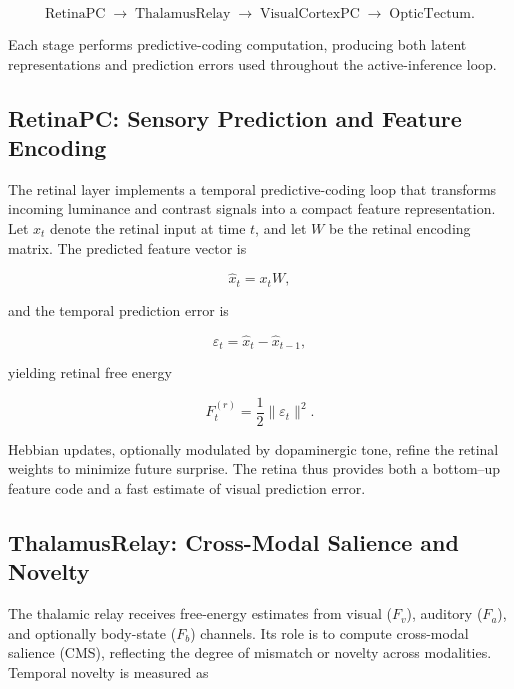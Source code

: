 \documentclass[9pt]{elife}
\begin{document}
\[
\text{RetinaPC} \;\rightarrow\; \text{ThalamusRelay} \;\rightarrow\; 
\text{VisualCortexPC} \;\rightarrow\; \text{OpticTectum}.
\]

Each stage performs predictive-coding computation, producing both latent
representations and prediction errors used throughout the active-inference loop.

\subsection{RetinaPC: Sensory Prediction and Feature Encoding}

The retinal layer implements a temporal predictive-coding loop that transforms
incoming luminance and contrast signals into a compact feature representation.
Let $x_t$ denote the retinal input at time $t$, and let $W$ be the retinal encoding
matrix.  The predicted feature vector is

\begin{equation}
\hat{x}_t = x_t W,
\end{equation}

and the temporal prediction error is

\begin{equation}
\varepsilon_t = \hat{x}_t - \hat{x}_{t-1},
\end{equation}

yielding retinal free energy

\begin{equation}
F^{(r)}_t = \frac{1}{2}\|\varepsilon_t\|^2.
\end{equation}

Hebbian updates, optionally modulated by dopaminergic tone, refine the retinal
weights to minimize future surprise.  
The retina thus provides both a bottom–up feature code and a fast estimate of
visual prediction error.

\subsection{ThalamusRelay: Cross-Modal Salience and Novelty}

The thalamic relay receives free-energy estimates from visual ($F_v$), auditory ($F_a$),
and optionally body-state ($F_b$) channels.  
Its role is to compute cross-modal salience (CMS), reflecting the degree of mismatch
or novelty across modalities.  
Temporal novelty is measured as
\end{document}
